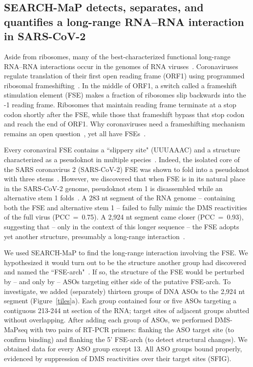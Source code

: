 \documentclass[main.tex]{subfiles}
\begin{document}
\subsection{SEARCH-MaP detects, separates, and quantifies a long-range RNA--RNA interaction in SARS-CoV-2}

Aside from ribosomes, many of the best-characterized functional long-range RNA--RNA interactions occur in the genomes of RNA viruses~\cite{Nicholson2014}.
Coronaviruses regulate translation of their first open reading frame (ORF1) using programmed ribosomal frameshifting~\cite{Plant2008}.
In the middle of ORF1, a switch called a frameshift stimulation element (FSE) makes a fraction of ribosomes slip backwards into the -1 reading frame.
Ribosomes that maintain reading frame terminate at a stop codon shortly after the FSE, while those that frameshift bypass that stop codon and reach the end of ORF1.
Why coronaviruses need a frameshifting mechanism remains an open question~\cite{Allan2023}, yet all have FSEs~\cite{Plant2008}.

Every coronaviral FSE contains a ``slippery site" (UUUAAAC) and a structure characterized as a pseudoknot in multiple species~\cite{Brierley1989,Herald1993,Plant2005b}.
Indeed, the isolated core of the SARS coronavirus 2 (SARS-CoV-2) FSE was shown to fold into a pseudoknot with three stems~\cite{KZhang2021,Roman2021,Jones2022}.
However, we discovered that when FSE is in its natural place in the SARS-CoV-2 genome, pseudoknot stem 1 is disassembled while an alternative stem 1 folds~\cite{Lan2022}.
A 283 nt segment of the RNA genome -- containing both the FSE and alternative stem 1 -- failed to fully mimic the DMS reactivities of the full virus (PCC~=~0.75).
A 2,924 nt segment came closer (PCC~=~0.93), suggesting that -- only in the context of this longer sequence -- the FSE adopts yet another structure, presumably a long-range interaction~\cite{Lan2022}.

We used SEARCH-MaP to find the long-range interaction involving the FSE.
We hypothesized it would turn out to be the structure another group had discovered and named the ``FSE-arch"~\cite{Ziv2020}.
If so, the structure of the FSE would be perturbed by -- and only by -- ASOs targeting either side of the putative FSE-arch.
To investigate, we added (separately) thirteen groups of DNA ASOs to the 2,924 nt segment (Figure~\ref{tiles}a).
Each group contained four or five ASOs targeting a contiguous 213-244 nt section of the RNA; target sites of adjacent groups abutted without overlapping.
After adding each group of ASOs, we performed DMS-MaPseq with two pairs of RT-PCR primers: flanking the ASO target site (to confirm binding) and flanking the 5' FSE-arch (to detect structural changes).
We obtained data for every ASO group except 13.
All ASO groups bound properly, evidenced by suppression of DMS reactivities over their target sites (SFIG).
\end{document}
